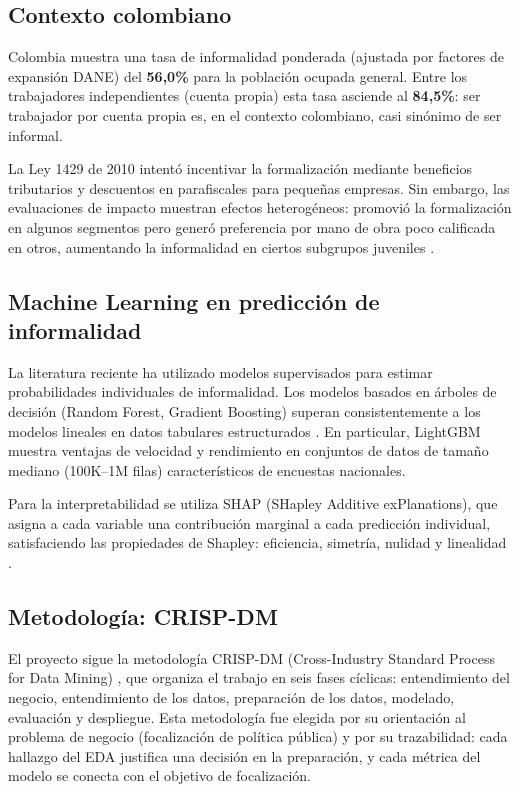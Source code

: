 \documentclass[12pt, a4paper]{article}
\begin{document}
\subsection{Contexto colombiano}

Colombia muestra una tasa de informalidad ponderada (ajustada por factores de expansión
DANE) del \textbf{56{,}0\%} para la población ocupada general. Entre los trabajadores
independientes (cuenta propia) esta tasa asciende al \textbf{84{,}5\%}: ser trabajador
por cuenta propia es, en el contexto colombiano, casi sinónimo de ser informal.

La Ley 1429 de 2010 intentó incentivar la formalización mediante beneficios tributarios
y descuentos en parafiscales para pequeñas empresas. Sin embargo, las evaluaciones de
impacto muestran efectos heterogéneos: promovió la formalización en algunos segmentos
pero generó preferencia por mano de obra poco calificada en otros, aumentando la
informalidad en ciertos subgrupos juveniles \cite{arizacedano2017}.

\subsection{Machine Learning en predicción de informalidad}

La literatura reciente ha utilizado modelos supervisados para estimar probabilidades
individuales de informalidad. Los modelos basados en árboles de decisión (Random Forest,
Gradient Boosting) superan consistentemente a los modelos lineales en datos tabulares
estructurados \cite{grinsztajn2022}. En particular, LightGBM muestra ventajas de velocidad
y rendimiento en conjuntos de datos de tamaño mediano (100K--1M filas) característicos
de encuestas nacionales.

Para la interpretabilidad se utiliza SHAP (SHapley Additive exPlanations), que asigna
a cada variable una contribución marginal a cada predicción individual, satisfaciendo las
propiedades de Shapley: eficiencia, simetría, nulidad y linealidad \cite{lundberg2017}.

\subsection{Metodología: CRISP-DM}

El proyecto sigue la metodología CRISP-DM (Cross-Industry Standard Process for Data
Mining) \cite{crisp2000}, que organiza el trabajo en seis fases cíclicas:
entendimiento del negocio, entendimiento de los datos, preparación de los datos,
modelado, evaluación y despliegue. Esta metodología fue elegida por su orientación
al problema de negocio (focalización de política pública) y por su trazabilidad:
cada hallazgo del EDA justifica una decisión en la preparación, y cada métrica del
modelo se conecta con el objetivo de focalización.
\end{document}
